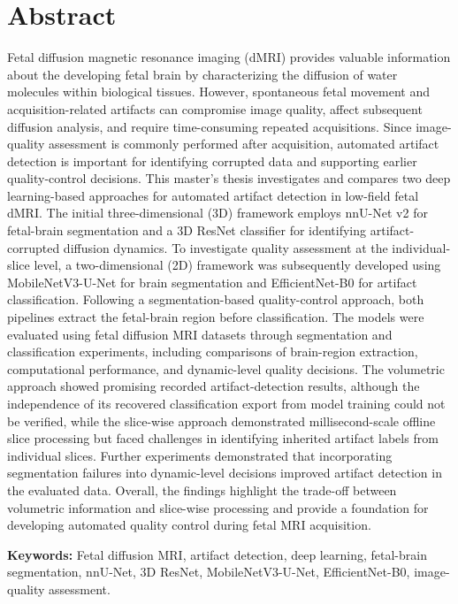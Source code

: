 \chapter*{Abstract}

Fetal diffusion magnetic resonance imaging (dMRI) provides valuable information about the developing fetal brain by characterizing the diffusion of water molecules within biological tissues. However, spontaneous fetal movement and acquisition-related artifacts can compromise image quality, affect subsequent diffusion analysis, and require time-consuming repeated acquisitions. Since image-quality assessment is commonly performed after acquisition, automated artifact detection is important for identifying corrupted data and supporting earlier quality-control decisions. This master's thesis investigates and compares two deep learning-based approaches for automated artifact detection in low-field fetal dMRI. The initial three-dimensional (3D) framework employs nnU-Net v2 for fetal-brain segmentation and a 3D ResNet classifier for identifying artifact-corrupted diffusion dynamics. To investigate quality assessment at the individual-slice level, a two-dimensional (2D) framework was subsequently developed using MobileNetV3-U-Net for brain segmentation and EfficientNet-B0 for artifact classification. Following a segmentation-based quality-control approach, both pipelines extract the fetal-brain region before classification. The models were evaluated using fetal diffusion MRI datasets through segmentation and classification experiments, including comparisons of brain-region extraction, computational performance, and dynamic-level quality decisions. The volumetric approach showed promising recorded artifact-detection results, although the independence of its recovered classification export from model training could not be verified, while the slice-wise approach demonstrated millisecond-scale offline slice processing but faced challenges in identifying inherited artifact labels from individual slices. Further experiments demonstrated that incorporating segmentation failures into dynamic-level decisions improved artifact detection in the evaluated data. Overall, the findings highlight the trade-off between volumetric information and slice-wise processing and provide a foundation for developing automated quality control during fetal MRI acquisition.

\noindent\textbf{Keywords:} Fetal diffusion MRI, artifact detection, deep learning, fetal-brain segmentation, nnU-Net, 3D ResNet, MobileNetV3-U-Net, EfficientNet-B0, image-quality assessment.
